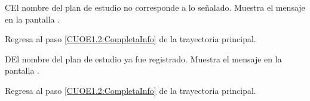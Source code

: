 \begin{UCtrayectoriaA}{C}{El nombre del plan de estudio no corresponde a lo señalado.}
	\UCpaso [\UCsist] Muestra el mensaje  en la pantalla .
	
	\UCpaso 
	Regresa al paso \ref{CUOE1.2:CompletaInfo} de la trayectoria principal.
\end{UCtrayectoriaA}

\begin{UCtrayectoriaA}{D}{El nombre del plan de estudio ya fue registrado.}
	\UCpaso [\UCsist] Muestra el mensaje  en la pantalla .
	
	\UCpaso Regresa al paso \ref{CUOE1.2:CompletaInfo} de la trayectoria principal.
\end{UCtrayectoriaA}

